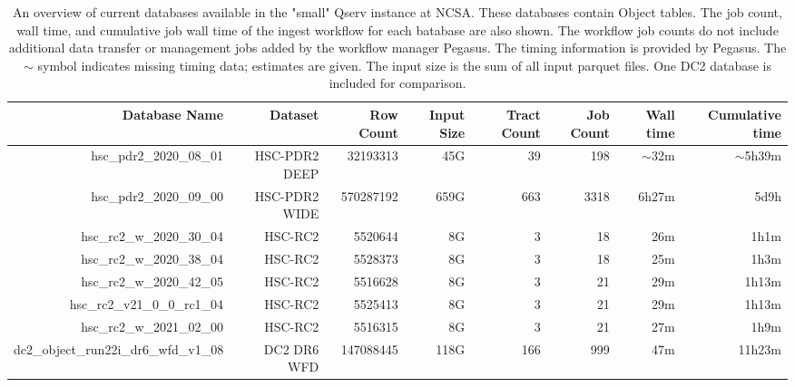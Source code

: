 \begin{table}
\tiny
\centering
\begin{tabular} {|r|r|r|r|r|r|r|r|}
\hline
{Database Name}&{Dataset}&{Row Count}&{Input Size}&{Tract Count}&{Job Count}&{Wall time}&{Cumulative time}
\\ \hline
{hsc\_pdr2\_2020\_08\_01} & HSC-PDR2 DEEP & 32193313  & 45G & 39  & 198 & $\sim$32m & $\sim$5h39m \\
{hsc\_pdr2\_2020\_09\_00} & HSC-PDR2 WIDE & 570287192 & 659G & 663 & 3318 & 6h27m & 5d9h \\

{hsc\_rc2\_w\_2020\_30\_04} & HSC-RC2 & 5520644 & 8G & 3 & 18 & 26m & 1h1m  \\
{hsc\_rc2\_w\_2020\_38\_04} & HSC-RC2 & 5528373 & 8G & 3 & 18 & 25m & 1h3m \\
{hsc\_rc2\_w\_2020\_42\_05} & HSC-RC2 & 5516628 & 8G & 3 & 21 & 29m & 1h13m \\

{hsc\_rc2\_v21\_0\_0\_rc1\_04 } & HSC-RC2 & 5525413 & 8G & 3 & 21 & 29m & 1h13m \\
{hsc\_rc2\_w\_2021\_02\_00} & HSC-RC2 & 5516315 & 8G & 3 & 21 & 27m & 1h9m \\

{dc2\_object\_run22i\_dr6\_wfd\_v1\_08} & DC2 DR6 WFD & 147088445 & 118G & 166 & 999 & 47m & 11h23m \\
\hline
\end{tabular}
\caption{
An overview of current databases available in the "small" Qserv instance at NCSA.
These databases contain Object tables.
The job count, wall time, and cumulative job wall time of the ingest workflow for each batabase are also shown.
The workflow job counts do not include additional data transfer or management jobs added by the workflow manager Pegasus.
The timing information is provided by Pegasus.
The $\sim$ symbol indicates missing timing data; estimates are given.
The input size is the sum of all input parquet files.
One DC2 database is included for comparison.
}
\label{tab:examples}
\end{table}
